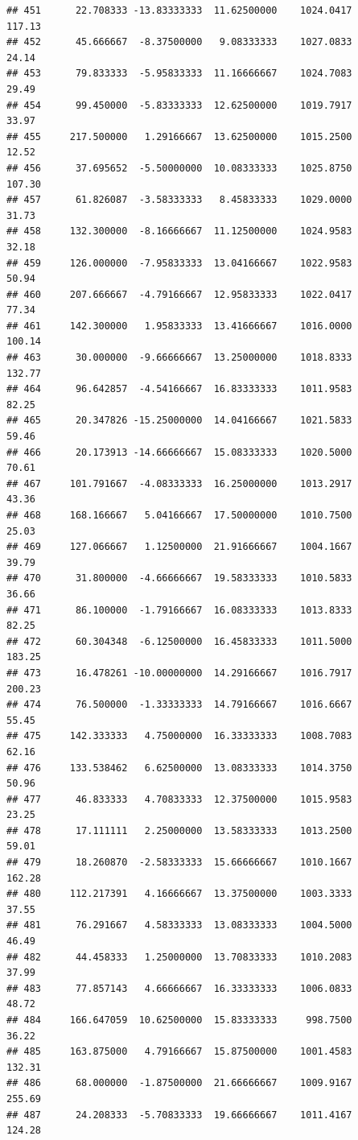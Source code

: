 \documentclass[
]{article}
\begin{document}
\begin{verbatim}
## 451      22.708333 -13.83333333  11.62500000    1024.0417      117.13
## 452      45.666667  -8.37500000   9.08333333    1027.0833       24.14
## 453      79.833333  -5.95833333  11.16666667    1024.7083       29.49
## 454      99.450000  -5.83333333  12.62500000    1019.7917       33.97
## 455     217.500000   1.29166667  13.62500000    1015.2500       12.52
## 456      37.695652  -5.50000000  10.08333333    1025.8750      107.30
## 457      61.826087  -3.58333333   8.45833333    1029.0000       31.73
## 458     132.300000  -8.16666667  11.12500000    1024.9583       32.18
## 459     126.000000  -7.95833333  13.04166667    1022.9583       50.94
## 460     207.666667  -4.79166667  12.95833333    1022.0417       77.34
## 461     142.300000   1.95833333  13.41666667    1016.0000      100.14
## 463      30.000000  -9.66666667  13.25000000    1018.8333      132.77
## 464      96.642857  -4.54166667  16.83333333    1011.9583       82.25
## 465      20.347826 -15.25000000  14.04166667    1021.5833       59.46
## 466      20.173913 -14.66666667  15.08333333    1020.5000       70.61
## 467     101.791667  -4.08333333  16.25000000    1013.2917       43.36
## 468     168.166667   5.04166667  17.50000000    1010.7500       25.03
## 469     127.066667   1.12500000  21.91666667    1004.1667       39.79
## 470      31.800000  -4.66666667  19.58333333    1010.5833       36.66
## 471      86.100000  -1.79166667  16.08333333    1013.8333       82.25
## 472      60.304348  -6.12500000  16.45833333    1011.5000      183.25
## 473      16.478261 -10.00000000  14.29166667    1016.7917      200.23
## 474      76.500000  -1.33333333  14.79166667    1016.6667       55.45
## 475     142.333333   4.75000000  16.33333333    1008.7083       62.16
## 476     133.538462   6.62500000  13.08333333    1014.3750       50.96
## 477      46.833333   4.70833333  12.37500000    1015.9583       23.25
## 478      17.111111   2.25000000  13.58333333    1013.2500       59.01
## 479      18.260870  -2.58333333  15.66666667    1010.1667      162.28
## 480     112.217391   4.16666667  13.37500000    1003.3333       37.55
## 481      76.291667   4.58333333  13.08333333    1004.5000       46.49
## 482      44.458333   1.25000000  13.70833333    1010.2083       37.99
## 483      77.857143   4.66666667  16.33333333    1006.0833       48.72
## 484     166.647059  10.62500000  15.83333333     998.7500       36.22
## 485     163.875000   4.79166667  15.87500000    1001.4583      132.31
## 486      68.000000  -1.87500000  21.66666667    1009.9167      255.69
## 487      24.208333  -5.70833333  19.66666667    1011.4167      124.28

\end{verbatim}
\end{document}

